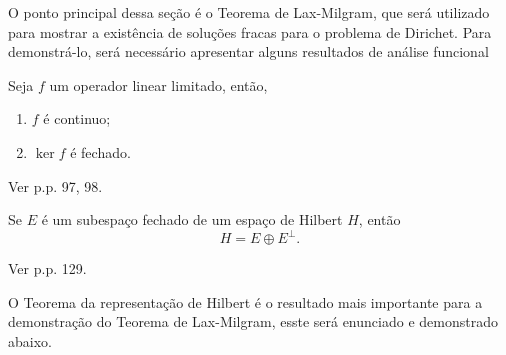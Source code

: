 \documentclass[a4paper, 11pt]{book}
\theoremstyle{definition}
\begin{document}
O ponto principal dessa seção é o Teorema de Lax-Milgram, que será utilizado para mostrar a existência de soluções fracas para o problema de Dirichet.
Para demonstrá-lo, será necessário apresentar alguns resultados de análise funcional
\begin{tbox} \label{thm:hilbert1}
    Seja $f$ um operador linear limitado, então,
    \begin{enumerate}[leftmargin=*, label=\textbf{(\alph*)}]
        \item $f$ é continuo;
        \item $\ker f$ é fechado.
    \end{enumerate}
\end{tbox}
\begin{prf}
    Ver \cite{kreyszig-functional.analysis} p.p. 97, 98.
\end{prf}

\begin{tbox} \label{thm:hilbert2}
    Se $E$ é um subespaço fechado de um espaço de Hilbert $H$, então
    \[
        H = E \oplus E^\perp.
    \]
\end{tbox}
\begin{prf}
    Ver \cite{cesar-analise.funcional} p.p. 129.
\end{prf}

O Teorema da representação de Hilbert é o resultado mais importante para a demonstração do Teorema de Lax-Milgram, esste será enunciado e demonstrado abaixo.
\end{document}
